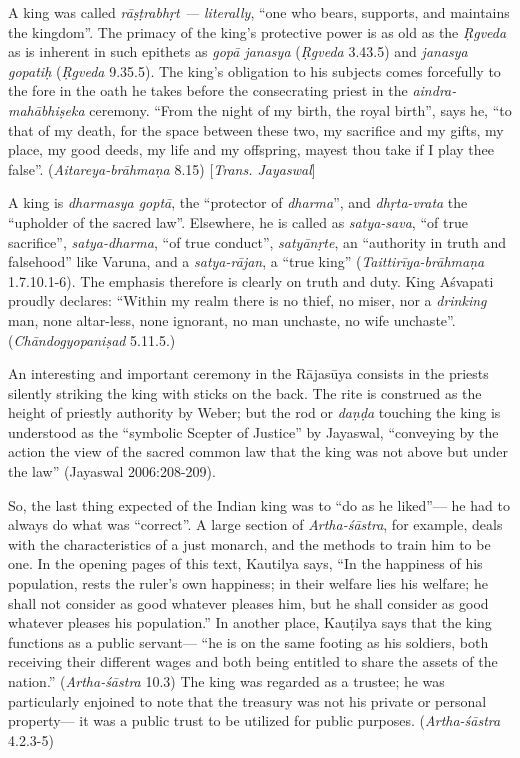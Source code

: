A king was called {\sl rāṣṭrabhṛt --- literally}, “one who bears, supports, and maintains the kingdom”.  The primacy of the king’s protective power is as old as the {\sl Ṛgveda} as is inherent in such epithets as {\sl gopā janasya} ({\sl Ṛgveda} 3.43.5) and {\sl janasya gopatiḥ} ({\sl Ṛgveda} 9.35.5). The king’s obligation to his subjects comes forcefully to the fore in the oath he takes before the consecrating priest in the {\sl aindra-mahābhiṣeka} ceremony. “From the night of my birth, the royal birth”, says he, “to that of my death, for the space between these two, my sacrifice and my gifts, my place, my good deeds, my life and my offspring, mayest thou take if I play thee false”. ({\sl Aitareya-brāhmaṇa} 8.15) [{\sl Trans. Jayaswal}]

 A king is {\sl dharmasya goptā}, the “protector of {\sl dharma}”, and {\sl dhṛta-vrata} the “upholder of the sacred law”. Elsewhere, he is called as {\sl satya-sava}, “of true sacrifice”, {\sl satya-dharma}, “of true conduct”, {\sl satyānṛte}, an “authority in truth and falsehood” like Varuna, and a {\sl satya-rājan}, a “true king” ({\sl Taittirīya-brāhmaṇa} 1.7.10.1-6). The emphasis therefore is clearly on truth and duty. King Aśvapati proudly declares: “Within my realm there is no thief, no miser, nor a {\sl drinking} man, none altar-less, none ignorant, no man unchaste, no wife unchaste”. ({\sl Chāndogyopaniṣad} 5.11.5.) 

An interesting and important ceremony in the Rājasūya consists in the priests silently striking the king with sticks on the back. The rite is construed as the height of priestly authority by Weber; but the rod or {\sl daṇḍa} touching the king is understood as the “symbolic Scepter of Justice” by Jayaswal, “conveying by the action the view of the sacred common law that the king was not above but under the law” (Jayaswal 2006:208-209). 

So, the last thing expected of the Indian king was to “do as he liked”--- he had to always do what was “correct”. A large section of {\sl Artha-śāstra}, for example, deals with the characteristics of a just monarch, and the methods to train him to be one. In the opening pages of this text, Kautilya says, “In the happiness of his population, rests the ruler’s own happiness; in their welfare lies his welfare; he shall not consider as good whatever pleases him, but he shall consider as good whatever pleases his population.” In another place, Kauṭilya says that the king functions as a public servant--- “he is on the same footing as his soldiers, both receiving their different wages and both being entitled to share the assets of the nation.” ({\sl Artha-śāstra} 10.3) The king was regarded as a trustee; he was particularly enjoined to note that the treasury was not his private or personal property--- it was a public trust to be utilized for public purposes. ({\sl Artha-śāstra} 4.2.3-5)

